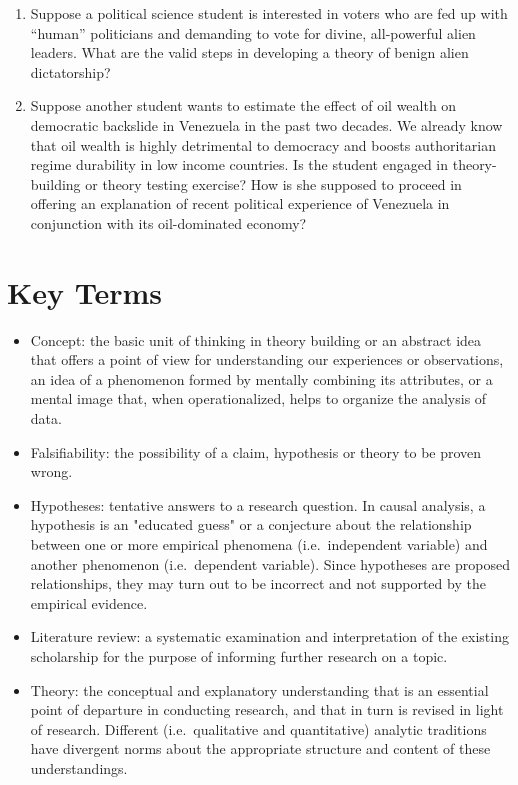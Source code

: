 \documentclass{book}
\begin{document}
\begin{enumerate}
\def\labelenumi{\arabic{enumi}.}
\item
  Suppose a political science student is interested in voters who are fed up
  with ``human'' politicians and demanding to vote for divine, all-powerful
  alien leaders. What are the valid steps in developing a theory of benign
  alien dictatorship?
\item
  Suppose another student wants to estimate the effect of oil wealth on
  democratic backslide in Venezuela in the past two decades. We already know
  that oil wealth is highly detrimental to democracy and boosts authoritarian
  regime durability in low income countries. Is the student engaged in
  theory-building or theory testing exercise? How is she supposed to proceed
  in offering an explanation of recent political experience of Venezuela in
  conjunction with its oil-dominated economy?
\end{enumerate}

\hypertarget{key-terms}{%
\section{Key Terms}\label{key-terms}}

\begin{itemize}
\item
  Concept: the basic unit of thinking in theory building or an abstract idea
  that offers a point of view for understanding our experiences or
  observations, an idea of a phenomenon formed by mentally combining its
  attributes, or a mental image that, when operationalized, helps to organize
  the analysis of data.
\item
  Falsifiability: the possibility of a claim, hypothesis or theory to be
  proven wrong.
\item
  Hypotheses: tentative answers to a research question. In causal analysis, a
  hypothesis is an "educated guess" or a conjecture about the relationship
  between one or more empirical phenomena (i.e.~independent variable) and
  another phenomenon (i.e.~dependent variable). Since hypotheses are proposed
  relationships, they may turn out to be incorrect and not supported by the
  empirical evidence.
\item
  Literature review: a systematic examination and interpretation of the
  existing scholarship for the purpose of informing further research on a
  topic.
\item
  Theory: the conceptual and explanatory understanding that is an essential
  point of departure in conducting research, and that in turn is revised in
  light of research. Different (i.e.~qualitative and quantitative) analytic
  traditions have divergent norms about the appropriate structure and content
  of these understandings.
\end{itemize}
\end{document}
